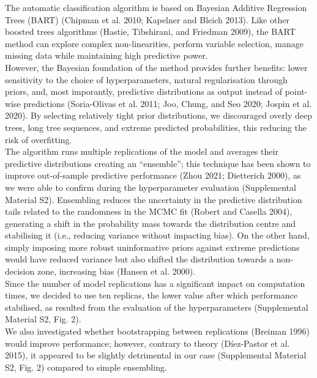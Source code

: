 \documentclass{article}
\begin{document}
The automatic classification algorithm is based on Bayesian Additive
Regression Trees (BART) (Chipman et al. 2010; Kapelner and Bleich 2013).
Like other boosted trees algorithms (Hastie, Tibshirani, and Friedman
2009), the BART method can explore complex non-linearities, perform
variable selection, manage missing data while maintaining high
predictive power.\\
However, the Bayesian foundation of the method provides further
benefits: lower sensitivity to the choice of hyperparameters, natural
regularisation through priors, and, most imporantly, predictive
distributions as output instead of point-wise predictions (Soria-Olivas
et al. 2011; Joo, Chung, and Seo 2020; Jospin et al. 2020). By selecting
relatively tight prior distributions, we discouraged overly deep trees,
long tree sequences, and extreme predicted probabilities, this reducing
the risk of overfitting.\\
The algorithm runs multiple replications of the model and averages their
predictive distributions creating an ``ensemble''; this technique has
been shown to improve out-of-sample predictive performance (Zhou 2021;
Dietterich 2000), as we were able to confirm during the hyperparameter
evaluation (Supplemental Material S2). Ensembling reduces the
uncertainty in the predictive distribution tails related to the
randomness in the MCMC fit (Robert and Casella 2004), generating a shift
in the probability mass towards the distribution centre and stabilising
it (i.e., reducing variance without impacting bias). On the other hand,
simply imposing more robust uninformative priors against extreme
predictions would have reduced variance but also shifted the
distribution towards a non-decision zone, increasing bias (Hansen et al.
2000).\\
Since the number of model replications has a significant impact on
computation times, we decided to use ten replicas, the lower value after
which performance stabilised, as resulted from the evaluation of the
hyperparameters (Supplemental Material S2, Fig. 2).\\
We also investigated whether bootstrapping between replications (Breiman
1996) would improve performance; however, contrary to theory
(Díez-Pastor et al. 2015), it appeared to be slightly detrimental in our
case (Supplemental Material S2, Fig. 2) compared to simple ensembling.\\
\end{document}
